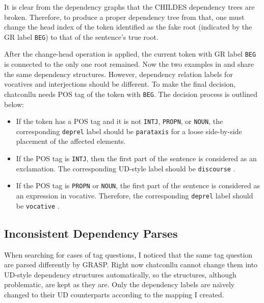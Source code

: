 It is clear from the dependency graphs that the CHILDES dependency trees are broken. Therefore, to produce a proper dependency tree from that, one must change the head index of the token identified as the fake root (indicated by the GR label \texttt{BEG}) to that of the sentence's true root.

After the change-head operation is applied, the current token with GR label \texttt{BEG} is connected to the only one root remained. Now the two examples in  and  share the same dependency structures. However, dependency relation labels for vocatives and interjections should be different. To make the final decision, chatconllu needs POS tag of the token with \texttt{BEG}. The decision process is outlined below:\\

\begin{itemize}
	\item If the token has a POS tag and it is not \texttt{INTJ}, \texttt{PROPN}, or \texttt{NOUN}, the corresponding \texttt{deprel}  label should be \texttt{parataxis} for a loose side-by-side placement of the affected elements.
	\item If the POS tag is \texttt{INTJ}, then the first part of the sentence is considered as an exclamation. The corresponding UD-style label should be \texttt{discourse} .
	\item If the POS tag is \texttt{PROPN} or \texttt{NOUN}, the first part of the sentence is considered as an expression in vocative. Therefore, the corresponding \texttt{deprel} label should be \texttt{vocative} .
\end{itemize}

\subsection{Inconsistent Dependency Parses}

When searching for cases of tag questions, I noticed that the same tag question are parsed differently by GRASP. Right now chatconllu cannot change them into UD-style dependency structures automatically, so the structures, although problematic, are kept as they are. Only the dependency labels are na\"{\i}vely changed to their UD counterparts according to the mapping I created.

